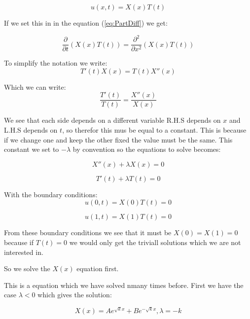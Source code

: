\documentclass[a4paper,10pt]{article}
\begin{document}
\begin{equation}
 u(x,t) = X(x)T(t)
 \label{eq:u_xt}
\end{equation}

If we set this in in the equation (\ref{eq:PartDiff}) we get:

\begin{equation}
  \frac{\partial }{\partial t}(X(x)T(t)) = \frac{\partial ^2}{\partial x^2}(X(x)T(t))
\end{equation}

To simplify the notation we write:
\begin{equation}
 T'(t)X(x) = T(t)X''(x)
\end{equation}

Which we can write:
\begin{equation}
 \frac{T'(t)}{T(t)} = \frac{X''(x)}{X(x)}
\end{equation}

We see that each side depends on a different variable R.H.S depends on $x$ and L.H.S depends on $t$, so therefor this mus be equal to a constant.
This is because if we change one and keep the other fixed the value must be the same. This constant we set to $-\lambda$ by convention so the equations
to solve becomes:

\begin{equation}
 X''(x) + \lambda X(x) = 0
\end{equation}

\begin{equation}
 T'(t) + \lambda T(t) = 0
\end{equation}

With the boundary conditions:
\begin{equation}
 u(0,t) = X(0)T(t) = 0
\end{equation}

\begin{equation}
 u(1,t) = X(1)T(t) = 0
\end{equation}

From these boundary conditions we see that it must be $X(0) = X(1) = 0$ because if $T(t)=0$ we would only get the triviall solutions which we are not interested in.

So we solve the $X(x)$ equation first.

This is a equation which we have solved nmany times before. First we have the case $\lambda < 0$ which gives the solution:

\begin{equation}
 X(x) = Ae^{\sqrt{k}x} + Be^{-\sqrt{k}x}, \lambda=-k
\end{equation}
\end{document}
